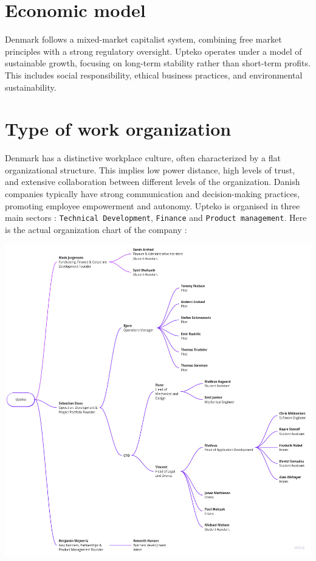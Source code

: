 \section{Economic model}
Denmark follows a mixed-market capitalist system, combining free market principles with a strong regulatory oversight. Upteko operates under a model of sustainable growth, focusing on long-term stability rather than short-term profits. This includes social responsibility, ethical business practices, and environmental sustainability.

\section{Type of work organization}
Denmark has a distinctive workplace culture, often characterized by a flat organizational structure. This implies low power distance, high levels of trust, and extensive collaboration between different levels of the organization. Danish companies typically have strong communication and decision-making practices, promoting employee empowerment and autonomy.
Upteko is organised in three main sectors : \texttt{Technical Development}, \texttt{Finance} and \texttt{Product management}. Here is the actual organization chart of the company :
\begin{center}
    \includegraphics[width=1.0\linewidth]{./company_presentation/upteko_organization.jpg}
\end{center}